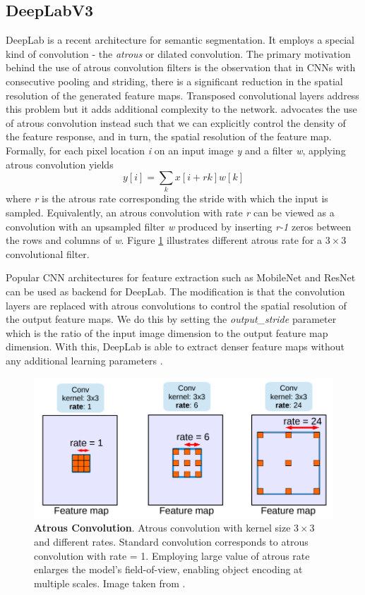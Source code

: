 \documentclass[10pt, journal, compsoc]{IEEEtran}
\begin{document}
\subsection{DeepLabV3}
DeepLab\cite{DBLP:journals/corr/ChenPSA17} is a recent architecture for semantic segmentation. It employs a special kind of convolution - the \textit{atrous} or dilated convolution. The primary motivation behind the use of atrous convolution filters is the observation that in CNNs with consecutive pooling and striding, there is a significant reduction in the spatial resolution of the generated feature maps. Transposed convolutional layers address this problem but it adds additional complexity to the network. \cite{DBLP:journals/corr/ChenPSA17} advocates the use of atrous convolution instead such that we can explicitly control the density of the feature response, and in turn, the spatial resolution of the feature map. Formally, for each pixel location \textit{i} on an input image \textit{y} and a filter \textit{w}, applying atrous convolution yields
\begin{equation}
y[i] = \sum_k x[i+rk]w[k]
\end{equation}
where \textit{r} is the atrous rate corresponding the stride with which the input is sampled. Equivalently, an atrous convolution with rate \textit{r} can be viewed as a convolution with an upsampled filter \textit{w} produced by inserting \textit{r-1} zeros between the rows and columns of \textit{w}. Figure \ref{fig:deeplab_atrous_conv} illustrates different atrous rate for a $3\times 3$ convolutional filter.

Popular CNN architectures for feature extraction such as MobileNet and ResNet can be used as backend for DeepLab. The modification is that the convolution layers are replaced with atrous convolutions to control the spatial resolution of the output feature maps. We do this by setting the \textit{output\_stride} parameter which is the ratio of the input image dimension to the output feature map dimension. With this, DeepLab is able to extract denser feature maps without any additional learning parameters \cite{DBLP:journals/corr/ChenPSA17}.
\begin{figure}
\includegraphics[width=\linewidth]{atrous_conv.png}
\caption{\textbf{Atrous Convolution}. Atrous convolution with kernel size $3\times 3$ and different rates. Standard convolution corresponds to atrous convolution
with rate = 1. Employing large value of atrous rate enlarges the
model’s field-of-view, enabling object encoding at multiple scales. Image taken from \cite{DBLP:journals/corr/ChenPSA17}.}
\label{fig:deeplab_atrous_conv}
\end{figure}
\end{document}
